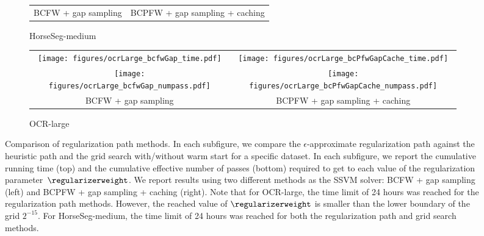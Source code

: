 \documentclass{article}
\begin{document}
\begin{figure*}
\begin{subfigure}[b]{0.48\textwidth}
\begin{tabular}{c@{$\:$}c}
        {\scriptsize BCFW + gap sampling}
        &
        {\scriptsize BCPFW + gap sampling + caching}
        \\[-0.0cm]
    \end{tabular}
    \caption{
        \label{fig:regPath_horseMedium} HorseSeg-medium
        }
\end{subfigure}
\quad
\begin{subfigure}[b]{0.48\textwidth}
    \begin{tabular}{c@{$\:$}c}
        \texttt{[image: figures/ocrLarge\_bcfwGap\_time.pdf]} &
        \texttt{[image: figures/ocrLarge\_bcPfwGapCache\_time.pdf]}\\
        \texttt{[image: figures/ocrLarge\_bcfwGap\_numpass.pdf]} &
        \texttt{[image: figures/ocrLarge\_bcPfwGapCache\_numpass.pdf]}\\
        {\scriptsize BCFW + gap sampling}
        &
        {\scriptsize BCPFW + gap sampling + caching}
        \\[-0.0cm]
    \end{tabular}
    \caption{
        \label{fig:regPath_ocrLarge} OCR-large
        }
\end{subfigure}
\caption{Comparison of regularization path methods. In each subfigure, we compare the $\epsilon$-approximate regularization path against the heuristic path and the grid search with/without warm start for a specific dataset. 
In each subfigure, we report the cumulative running time (top) and the cumulative effective number of passes (bottom) required to get to each value of the regularization parameter~$\regularizerweight$. We report results using two different methods as the SSVM solver: BCFW + gap sampling (left) and BCPFW + gap sampling + caching (right).
    Note that for OCR-large, the time limit of 24 hours was reached for the regularization path methods.
    However, the reached value of $\regularizerweight$ is smaller than the lower boundary of the grid $2^{-15}$.
    For HorseSeg-medium, the time limit of 24 hours was reached for both the regularization path and grid search methods.
    \label{fig:regPath_4datasets}}
\end{figure*}

\clearpage
{}
\end{document}
